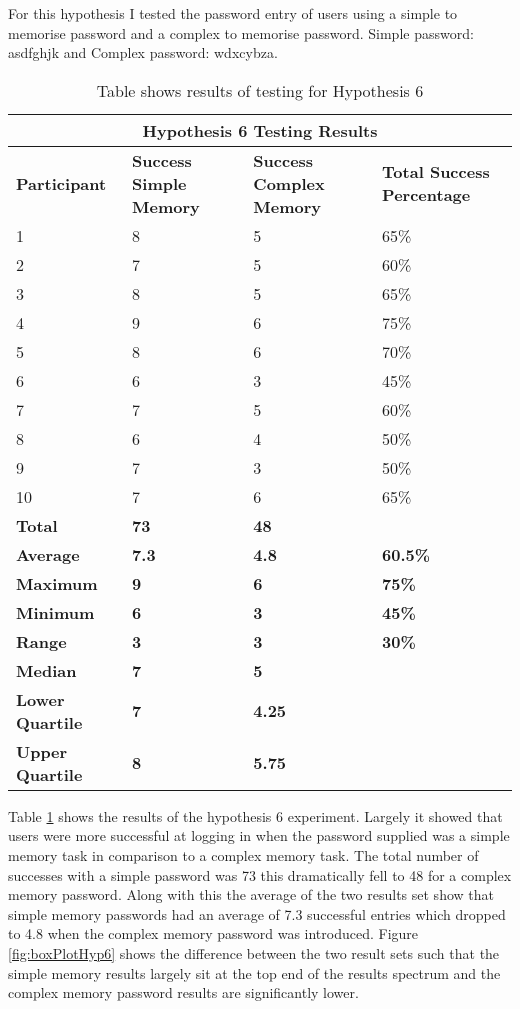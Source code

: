 \documentclass{article}
\begin{document}
For this hypothesis I tested the password entry of users using a simple to memorise password and a complex to memorise password. Simple password: asdfghjk and Complex password: wdxcybza. 


{
\begin{table} [H]
\centering
\begin{tabular}{ |p{2cm}|p{4cm}|p{4cm}| p{4cm} | }
\hline
\multicolumn{4}{|c|}{\textbf{Hypothesis 6 Testing Results}} \\
\hline
\textbf{Participant} & \textbf{Success Simple Memory} & \textbf{Success Complex Memory} & \textbf{Total Success Percentage} \\
\hline
1 & 8 & 5 & 65\% \\
\hline
2 & 7 & 5 & 60\% \\
\hline
3 & 8 & 5 & 65\% \\
\hline
4 & 9 & 6 & 75\%  \\
\hline
5 & 8 & 6 & 70\% \\
\hline
6 & 6 & 3 & 45\% \\
\hline
7 & 7 & 5 & 60\% \\
\hline
8 & 6 & 4 & 50\% \\
\hline
9 & 7 & 3 & 50\% \\
\hline
10 & 7 & 6 & 65\% \\
\hline
\textbf{Total} & \textbf{73} & \textbf{48} & \\
\hline
\textbf{Average} & \textbf{7.3} & \textbf{4.8} & \textbf{60.5\%} \\
\hline
\textbf{Maximum} & \textbf{9} & \textbf{6} & \textbf{75\%} \\
\hline
\textbf{Minimum} & \textbf{6} & \textbf{3} & \textbf{45\%} \\
\hline
\textbf{Range} & \textbf{3} & \textbf{3} & \textbf{30\%} \\
\hline
\textbf{Median} & \textbf{7} & \textbf{5} & \\
\hline
\textbf{Lower Quartile} & \textbf{7} & \textbf{4.25} & \\
\hline
\textbf{Upper Quartile} & \textbf{8} & \textbf{5.75} & \\
\hline
\end{tabular}
\caption{Table shows results of testing for Hypothesis 6}
\label{table:7}
\end{table}
}

Table \ref{table:7} shows the results of the hypothesis 6 experiment. Largely it showed that users were more successful at logging in when the password supplied was a simple memory task in comparison to a complex memory task. The total number of successes with a simple password was 73 this dramatically fell to 48 for a complex memory password. Along with this the average of the two results set show that simple memory passwords had an average of 7.3 successful entries which dropped to 4.8 when the complex memory password was introduced. Figure \ref{fig:boxPlotHyp6} shows the difference between the two result sets such that the simple memory results largely sit at the top end of the results spectrum and the complex memory password results are significantly lower. 
\end{document}
